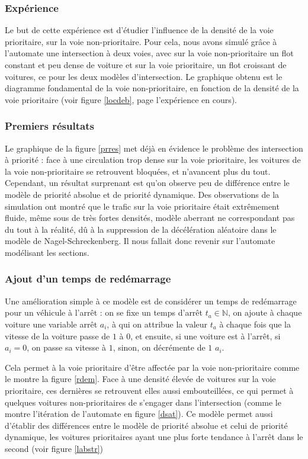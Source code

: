 \documentclass[11pt]{article}
\begin{document}
		\subsubsection{Expérience}
Le but de cette expérience est d'étudier l'influence de la densité de la voie prioritaire, sur la voie non-prioritaire. Pour cela, nous avons simulé grâce à l'automate une intersection à deux voies, avec sur la voie non-prioritaire un flot constant et peu dense de voiture et sur la voie prioritaire, un flot croissant de voitures, ce pour les deux modèles d'intersection. Le graphique obtenu est le diagramme fondamental de la voie non-prioritaire, en fonction de la densité de la voie prioritaire (voir figure \ref{locdeb}, page \pageref{locdeb} l'expérience en cours).
		
		\subsubsection{Premiers résultats}

Le graphique de la figure \ref{prres} met déjà en évidence le problème des intersection à priorité : face à une circulation trop dense sur la voie prioritaire, les voitures de la voie non-prioritaire se retrouvent bloquées, et n'avancent plus du tout. Cependant, un résultat surprenant est qu'on observe peu de différence entre le modèle de priorité absolue et de priorité dynamique. Des observations de la simulation ont montré que le trafic sur la voie prioritaire était extrêmement fluide, même sous de très fortes densités, modèle aberrant ne correspondant pas du tout à la réalité, dû à la suppression de la décélération aléatoire dans le modèle de Nagel-Schreckenberg. Il nous fallait donc revenir sur l'automate modélisant les sections.

	\subsubsection{Ajout d'un temps de redémarrage}
Une amélioration simple à ce modèle est de considérer un temps de redémarrage pour un véhicule à l'arrêt : on se fixe un temps d'arrêt $t_{a} \in \mathbb{N}$, on ajoute à chaque voiture une variable arrêt $a_i$, à qui on attribue la valeur $t_{a}$ à chaque fois que la vitesse de la voiture passe de $1$ à $0$, et ensuite, si une voiture est à l'arrêt, si $a_i = 0$, on passe sa vitesse à $1$, sinon, on décrémente de $1$ $a_i$.\par Cela permet à la voie prioritaire d'être affectée par la voie non-prioritaire comme le montre la figure \ref{rdem}. Face à une densité élevée de voitures sur la voie prioritaire, ces dernières se retrouvent elles aussi embouteillées, ce qui permet à quelques voitures non-prioritaires de s'engager dans l'intersection (comme le montre l'itération de l'automate en figure \ref{dsat}). Ce modèle permet aussi d'établir des différences entre le modèle de priorité absolue et celui de priorité dynamique, les voitures prioritaires ayant une plus forte tendance à l'arrêt dans le second (voir figure \ref{labstr})
\end{document}
